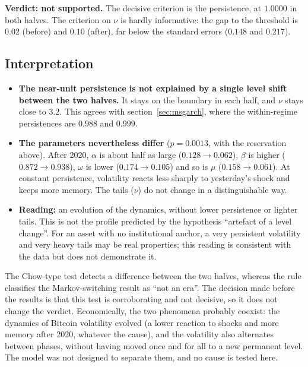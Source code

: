 \documentclass[12pt,a4paper]{article}
\begin{document}
\textbf{Verdict: not supported.} The decisive criterion is the persistence, at $1.0000$ in both halves. The criterion on $\nu$ is hardly informative: the gap to the threshold is $0.02$ (before) and $0.10$ (after), far below the standard errors ($0.148$ and $0.217$).

\subsection{Interpretation}

\begin{itemize}
	\item \textbf{The near-unit persistence is not explained by a single level shift between the two halves.} It stays on the boundary in each half, and $\nu$ stays close to $3.2$. This agrees with section~\ref{sec:msgarch}, where the within-regime persistences are $0.988$ and $0.999$.
	\item \textbf{The parameters nevertheless differ} ($p=0.0013$, with the reservation above). After 2020, $\alpha$ is about half as large ($0.128\to0.062$), $\beta$ is higher ($0.872\to0.938$), $\omega$ is lower ($0.174\to0.105$) and so is $\mu$ ($0.158\to0.061$). At constant persistence, volatility reacts less sharply to yesterday's shock and keeps more memory. The tails ($\nu$) do not change in a distinguishable way.
	\item \textbf{Reading:} an evolution of the dynamics, without lower persistence or lighter tails. This is not the profile predicted by the hypothesis ``artefact of a level change''. For an asset with no institutional anchor, a very persistent volatility and very heavy tails may be real properties; this reading is consistent with the data but does not demonstrate it.
\end{itemize}

\begin{econbox}
	The Chow-type test detects a difference between the two halves, whereas the rule classifies the Markov-switching result as ``not an era''. The decision made before the results is that this test is corroborating and not decisive, so it does not change the verdict. Economically, the two phenomena probably coexist: the dynamics of Bitcoin volatility evolved (a lower reaction to shocks and more memory after 2020, whatever the cause), and the volatility also alternates between phases, without having moved once and for all to a new permanent level. The model was not designed to separate them, and no cause is tested here.
\end{econbox}
\end{document}
